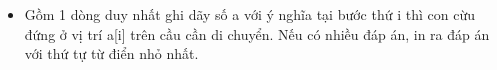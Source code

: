 \begin{itemize}
	\item Gồm 1 dòng duy nhất ghi dãy số a với ý nghĩa tại bước thứ i thì con cừu đứng ở vị trí a[i] trên cầu cần di chuyển. Nếu có nhiều đáp án, in ra đáp án với thứ tự từ điển nhỏ nhất.
\end{itemize}

\